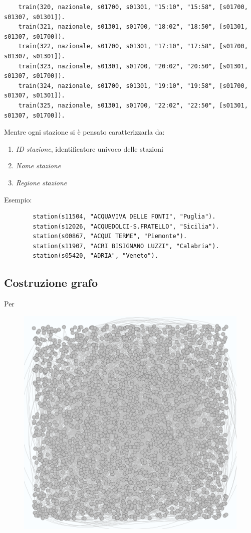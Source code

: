 \documentclass[italian,12pt,a4paper]{article}
\begin{document}
\begin{small}

\begin{verbatim}
	train(320, nazionale, s01700, s01301, "15:10", "15:58", [s01700, s01307, s01301]).
	train(321, nazionale, s01301, s01700, "18:02", "18:50", [s01301, s01307, s01700]).
	train(322, nazionale, s01700, s01301, "17:10", "17:58", [s01700, s01307, s01301]).
	train(323, nazionale, s01301, s01700, "20:02", "20:50", [s01301, s01307, s01700]).
	train(324, nazionale, s01700, s01301, "19:10", "19:58", [s01700, s01307, s01301]).
	train(325, nazionale, s01301, s01700, "22:02", "22:50", [s01301, s01307, s01700]).
\end{verbatim}
\end{small}
	Mentre ogni stazione si è pensato caratterizzarla da:
	
			\begin{enumerate}
				\item \textit{ID stazione}, identificatore univoco delle stazioni
				\item \textit{Nome stazione}
				\item \textit{Regione stazione}
			\end{enumerate}
		Esempio:

\begin{small}
	
	\begin{verbatim}
		station(s11504, "ACQUAVIVA DELLE FONTI", "Puglia").
		station(s12026, "ACQUEDOLCI-S.FRATELLO", "Sicilia").
		station(s00867, "ACQUI TERME", "Piemonte").
		station(s11907, "ACRI BISIGNANO LUZZI", "Calabria").
		station(s05420, "ADRIA", "Veneto").
	\end{verbatim}
\end{small}

\subsection{Costruzione grafo}
	Per
	
	\begin{figure}[ht]
		\centering
		\includegraphics[width=0.5\linewidth]{img/stations_graph}
		\caption{}
		\label{fig:stationsgraph}
	\end{figure}
	
\end{document}

